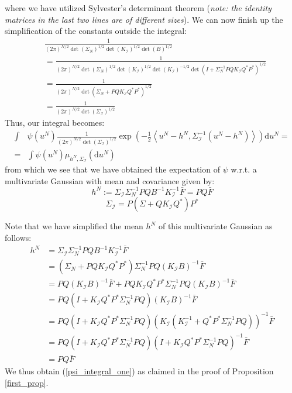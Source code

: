 where we have utilized Sylvester's determinant theorem (\textit{note: the identity matrices in the last two lines are of different sizes}). We can now finish up the simplification of the constants outside the integral:
\begin{align*}
    &\frac{1}{(2\pi)^{N/2}\det(\Sigma_N)^{1/2}\det(K_\mathcal{I})^{1/2}\det(B)^{1/2}} \\
    &=\frac{1}{(2\pi)^{N/2}\det(\Sigma_N)^{1/2}\det(K_\mathcal{I})^{1/2}\det(K_{\mathcal{I}})^{-1/2}\det(I+\Sigma_{N}^{-1}PQK_{\mathcal{I}}Q^{*}P^{*})^{1/2}} \\
    &= \frac{1}{(2\pi)^{N/2}\det(\Sigma_{N} + PQK_{\mathcal{I}}Q^{*}P^{*})^{1/2}} \\
    &=\frac{1}{(2\pi)^{N/2}\det(\Sigma_{\mathcal{I}})^{1/2}}
\end{align*}
Thus, our integral becomes:
\begin{align}
    \int&\psi(u^{N})\frac{1}{(2\pi)^{N/2}\det(\Sigma_{\mathcal{I}})^{1/2}}\exp\left(-\frac{1}{2}\left\langle u^{N}-h^{N}, \Sigma_{\mathcal{I}}^{-1}(u^{N}-h^{N}) \right\rangle\right)\mathrm{d}u^N = \nonumber \\
    =&\int\psi(u^{N})\mu_{h^{N},\Sigma_{\mathcal{I}}}(\mathrm{d}u^N)
\end{align}
from which we see that we have obtained the expectation of $\psi$ w.r.t. a multivariate Gaussian with mean and covariance given by:
\begin{equation}
    h^{N}:=\Sigma_{\mathcal{I}}\Sigma_{N}^{-1}PQB^{-1}K_{\mathcal{I}}^{-1}\bar{F}=PQ\bar{F}
\end{equation}
\begin{equation}
    \Sigma_{\mathcal{I}}=P(\Sigma+QK_{\mathcal{I}}Q^{*})P^{*}
\end{equation}

\noindent Note that we have simplified the mean $h^N$ of this multivariate Gaussian as follows:
\begin{align*}
    h^N &= \Sigma_{\mathcal{I}}\Sigma_{N}^{-1}PQB^{-1}K_{\mathcal{I}}^{-1}\bar{F} \\
    &=(\Sigma_N+PQK_{\mathcal{I}}Q^{*}P^{*})\Sigma_{N}^{-1}PQ(K_{\mathcal{I}}B)^{-1}\bar{F} \\
    &=PQ(K_{\mathcal{I}}B)^{-1}\bar{F}+PQK_{\mathcal{I}}Q^{*}P^{*}\Sigma_{N}^{-1}PQ(K_{\mathcal{I}}B)^{-1}\bar{F} \\
    &=PQ(I+K_{\mathcal{I}}Q^{*}P^{*}\Sigma_{N}^{-1}PQ)(K_{\mathcal{I}}B)^{-1}\bar{F} \\
    &=PQ(I+K_{\mathcal{I}}Q^{*}P^{*}\Sigma_{N}^{-1}PQ)(K_{\mathcal{I}}(K_{\mathcal{I}}^{-1}+Q^{*}P^{*}\Sigma_{N}^{-1}PQ))^{-1}\bar{F}\\
    &=PQ(I+K_{\mathcal{I}}Q^{*}P^{*}\Sigma_{N}^{-1}PQ)(I+K_{\mathcal{I}}Q^{*}P^{*}\Sigma_{N}^{-1}PQ)^{-1}\bar{F}\\
    &=PQ\bar{F}
\end{align*}
We thus obtain (\ref{psi_integral_one}) as claimed in the proof of Proposition \textcolor{blue}{\ref{first_prop}}. \qedsymbol

